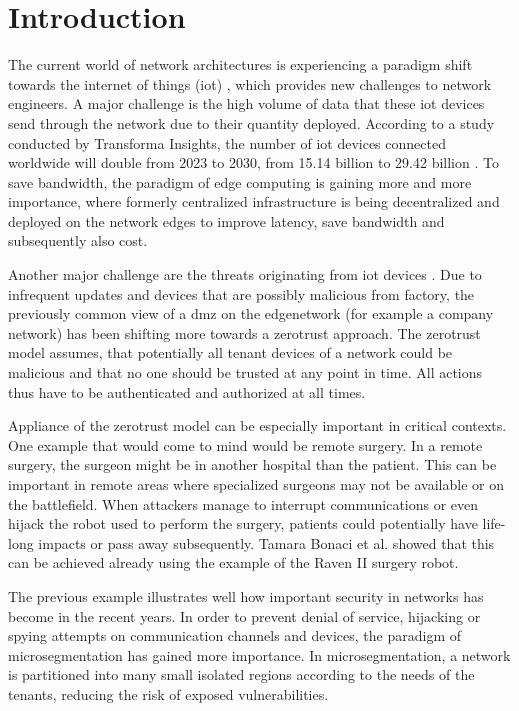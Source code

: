 \chapter{Introduction}

The current world of network architectures is experiencing a paradigm shift towards the internet of things (\acrshort{iot}) \cite{iot}, which provides new challenges to network engineers. A major challenge is the high volume of data that these \acrshort{iot} devices send through the network due to their quantity deployed. According to a study conducted by Transforma Insights, the number of \acrshort{iot} devices connected worldwide will double from 2023 to 2030, from 15.14 billion to 29.42 billion \cite{iotincrease}. To save \gls{bandwidth}, the paradigm of edge computing \cite{edgecomputing} is gaining more and more importance, where formerly centralized infrastructure is being decentralized and deployed on the network edges to improve \gls{latency}, save \gls{bandwidth} and subsequently also cost.

Another major challenge are the threats originating from \acrshort{iot} devices \cite{iotthreats}. Due to infrequent updates and devices that are possibly malicious from factory, the previously common view of a \gls{dmz} on the \gls{edgenetwork} (for example a company network) has been shifting more towards a \gls{zerotrust} approach. The \gls{zerotrust} model \cite{zerotrust} assumes, that potentially all tenant devices of a network could be malicious and that no one should be trusted at any point in time. All actions thus have to be authenticated and authorized at all times.

Appliance of the \gls{zerotrust} model can be especially important in critical contexts. One example that would come to mind would be remote surgery. In a remote surgery, the surgeon might be in another hospital than the patient. This can be important in remote areas where specialized surgeons may not be available or on the battlefield. When attackers manage to interrupt communications or even hijack the robot used to perform the surgery, patients could potentially have life-long impacts or pass away subsequently. Tamara Bonaci et al. \cite{remotesurgeryhijacking} showed that this can be achieved already using the example of the Raven II surgery robot.

The previous example illustrates well how important security in networks has become in the recent years. In order to prevent denial of service, hijacking or spying attempts on communication channels and devices, the paradigm of \gls{microsegmentation} \cite{zerotrust} has gained more importance. In \gls{microsegmentation}, a network is partitioned into many small isolated regions according to the needs of the tenants, reducing the risk of exposed vulnerabilities.

